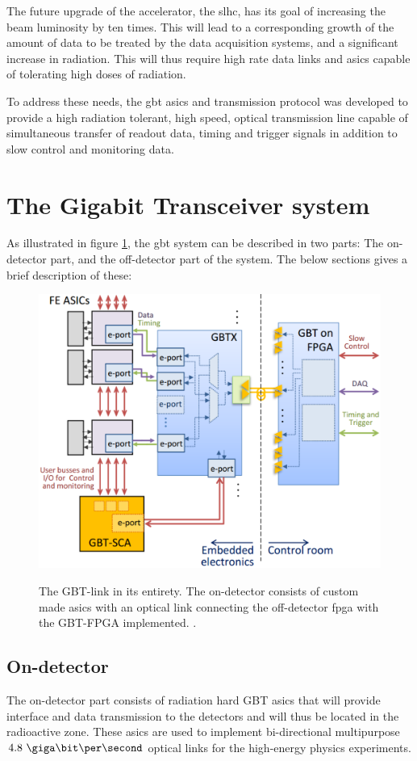 \documentclass[main.tex]{subfiles}
\begin{document}
The future upgrade of the  accelerator, the \gls{slhc}, has its goal of increasing the beam luminosity by ten times. This will lead to a corresponding growth of the amount of data to be treated by the data acquisition systems, and a significant increase in radiation. This will thus require high rate data links and \glspl{asic} capable of tolerating high doses of radiation.

To address these needs, the \gls{gbt} \glspl{asic} and transmission protocol was developed to provide a high radiation tolerant, high speed, optical transmission line capable of simultaneous transfer of readout data, timing and trigger signals in addition to slow control and monitoring data.

\section{The Gigabit Transceiver system}
As illustrated in figure \ref{fig:gbtsys}, the \gls{gbt} system can be described in two parts: The on-detector part, and the off-detector part of the system. The below sections gives a brief description of these:

\begin{figure}[!b] %
\includegraphics[width=0.7\linewidth]{../img/gbtsys}  \\[0.1 cm]
\caption{The GBT-link in its entirety. The on-detector consists of custom made \glspl{asic} with an optical link connecting the off-detector \gls{fpga} with the GBT-FPGA implemented. \cite[Figure 1]{gbtscapres14}.}
\label{fig:gbtsys}
\end{figure}

\subsection{On-detector}
The on-detector part consists of radiation hard GBT \acrshort{asic}s that will provide interface and data transmission to the detectors and will thus be located in the radioactive zone. These \glspl{asic} are used to implement bi-directional multipurpose $4.8~\giga\bit\per\second$ optical links for the high-energy physics experiments.
\end{document}
